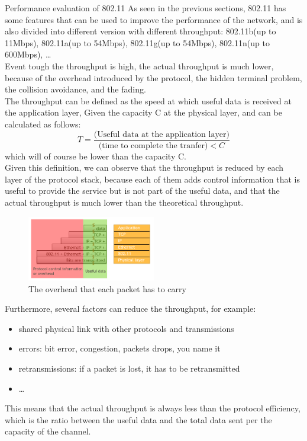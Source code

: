 \begin{section}{Performance evaluation of 802.11}
  As seen in the previous sections, 802.11 has some features that can be used to improve the
  performance of the network, and is also divided into different version with different 
  throughput: 802.11b(up to 11Mbps), 802.11a(up to 54Mbps), 802.11g(up to 54Mbps), 802.11n(up to 600Mbps),
  \dots\\
  Event tough the throughput is high, the actual throughput is much lower, because of the overhead
  introduced by the protocol, the hidden terminal problem, the collision avoidance, and the fading.\\
  The throughput can be defined as the speed at which useful data is received at the application layer,
  Given the capacity C at the physical layer, and can be calculated as follows:
  \begin{equation}
    T = \frac{\text{(Useful data at the application layer)}}{\text{(time to complete the tranfer)}<C}
  \end{equation}
  which will of course be lower than the capacity C.\\
  Given this definition, we can observe that the throughput is reduced by each layer of the protocol stack,
  because each of them adds control information that is useful to provide the service but is not part of
  the useful data, and that the actual throughput is much lower than the theoretical throughput.\\
  \begin{figure}[h]
    \centering
    \includegraphics[width=0.5\textwidth]{img/wireless/encapsulation overhead.png}
    \caption{The overhead that each packet has to carry}
  \end{figure}
  Furthermore, several factors can reduce the throughput, for example:
  \begin{itemize}
    \item shared physical link with other protocols and transmissions
    \item errors: bit error, congestion, packets drops, you name it
    \item retransmissions: if a packet is lost, it has to be retransmitted
    \item \dots 
  \end{itemize}
  This means that the actual throughput is always less than the protocol efficiency, which is the
  ratio between the useful data and the total data sent per the capacity of the channel.\\


\end{section}
